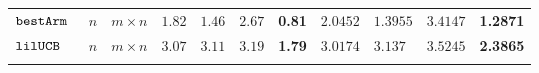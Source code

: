 {\begin {table}[t]
\begin{center}
{\begin{tabular}{|| >{\tiny}l || c | c || c | l | c | r || c | l | c | r || }
        \hhline{||-||---||-||--||----||}
        $\mathtt{bestArm}$~\cite{Jamieson2015TheAO} & $ n $ & $  m \times n $  & $1.82$  & $1.46$ & $2.67$ & \textbf{0.81}& $ 2.0452$   & $ 1.3955$ & {{$3.4147$}} & \textbf{1.2871} \\
        \hhline{||-||---||-||--||----||}
        $\mathtt{lilUCB}$~\cite{Jamieson2015TheAO} & $ n $ & $ m \times n $ & $3.07$  & $3.11$ & $3.19$ & \textbf{1.79}& $3.0174$   & $ 3.137$ & {$3.5245$} & \textbf{2.3865}   \\
        \hhline{|:t=========== t:|}
\end{tabular}
}
\end{center}
\vspace{-0.5cm}
\end{table}
}




